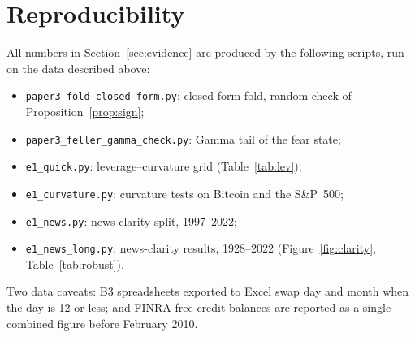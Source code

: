 \documentclass[11pt,a4paper]{article}
\theoremstyle{remark}
\begin{document}
\section{Reproducibility}

All numbers in Section~\ref{sec:evidence} are produced by the following scripts, run on the
data described above:
\begin{itemize}[leftmargin=*]
\item \texttt{paper3\_fold\_closed\_form.py}: closed-form fold, random check of
Proposition~\ref{prop:sign};
\item \texttt{paper3\_feller\_gamma\_check.py}: Gamma tail of the fear state;
\item \texttt{e1\_quick.py}: leverage--curvature grid (Table~\ref{tab:lev});
\item \texttt{e1\_curvature.py}: curvature tests on Bitcoin and the S\&P~500;
\item \texttt{e1\_news.py}: news-clarity split, 1997--2022;
\item \texttt{e1\_news\_long.py}: news-clarity results, 1928--2022
(Figure~\ref{fig:clarity}, Table~\ref{tab:robust}).
\end{itemize}
Two data caveats: B3 spreadsheets exported to Excel swap day and month when the day is 12
or less; and FINRA free-credit balances are reported as a single combined figure before
February 2010.
\end{document}
